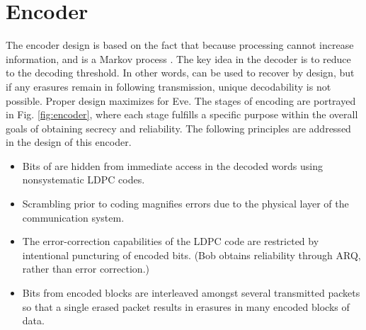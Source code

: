 \documentclass[10pt,twocolumn,twoside]{IEEEtran} \newlength{\pic}
\theoremstyle{definition}
\theoremstyle{remark}
\theoremstyle{plain}
\begin{document}
\section{Encoder}\label{sec:encoder}

The encoder design is based on the fact that  because processing cannot increase information, and  is a Markov process \cite{Cover}. The key idea in the decoder is to reduce  to the decoding threshold. In other words,  can be used to recover  by design, but if any erasures remain in  following transmission, unique decodability is not possible. Proper design maximizes  for Eve. The stages of encoding are portrayed in Fig. \ref{fig:encoder}, where each stage fulfills a specific purpose within the overall goals of obtaining secrecy and reliability. The following principles are addressed in the design of this encoder.
\begin{itemize}
  \item Bits of  are hidden from immediate access in the decoded words using nonsystematic LDPC codes.
  \item Scrambling prior to coding magnifies errors due to the physical layer of the communication system.
  \item The error-correction capabilities of the LDPC code are restricted by intentional puncturing of encoded bits. (Bob obtains reliability through ARQ, rather than error correction.)
  \item Bits from encoded blocks are interleaved amongst several transmitted packets so that a single erased packet results in erasures in many encoded blocks of data.
\end{itemize}
\end{document}
